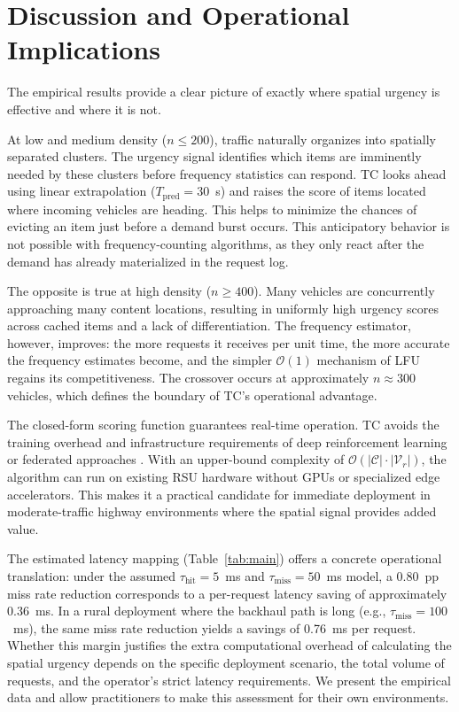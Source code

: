 \documentclass[preprint,12pt]{elsarticle}
\begin{document}
	\section{Discussion and Operational Implications}

	\label{sec:discussion}
	
	The empirical results provide a clear picture of exactly where spatial urgency is effective and where it is not. 
	
	At low and medium density ($n \leq 200$), traffic naturally organizes into spatially separated clusters. The urgency signal identifies which items are imminently needed by these clusters before frequency statistics can respond. TC looks ahead using linear extrapolation ($T_\text{pred} = 30$~s) and raises the score of items located where incoming vehicles are heading. This helps to minimize the chances of evicting an item just before a demand burst occurs. This anticipatory behavior is not possible with frequency-counting algorithms, as they only react after the demand has already materialized in the request log.
	
	The opposite is true at high density ($n \geq 400$). Many vehicles are concurrently approaching many content locations, resulting in uniformly high urgency scores across cached items and a lack of differentiation. The frequency estimator, however, improves: the more requests it receives per unit time, the more accurate the frequency estimates become, and the simpler $\mathcal{O}(1)$ mechanism of LFU regains its competitiveness. The crossover occurs at approximately $n \approx 300$ vehicles, which defines the boundary of TC's operational advantage.
	
	The closed-form scoring function guarantees real-time operation. TC avoids the training overhead and infrastructure requirements of deep reinforcement learning or federated approaches \cite{he2018mobility}. With an upper-bound complexity of $\mathcal{O}(|\mathcal{C}| \cdot |\mathcal{V}_r|)$, the algorithm can run on existing RSU hardware without GPUs or specialized edge accelerators. This makes it a practical candidate for immediate deployment in moderate-traffic highway environments where the spatial signal provides added value.
	
	The estimated latency mapping (Table~\ref{tab:main}) offers a concrete operational translation: under the assumed $\tau_\text{hit} = 5$~ms and $\tau_\text{miss} = 50$~ms model, a 0.80~pp miss rate reduction corresponds to a per-request latency saving of approximately 0.36~ms. In a rural deployment where the backhaul path is long (e.g., $\tau_\text{miss} = 100$~ms), the same miss rate reduction yields a savings of 0.76~ms per request. Whether this margin justifies the extra computational overhead of calculating the spatial urgency depends on the specific deployment scenario, the total volume of requests, and the operator's strict latency requirements. We present the empirical data and allow practitioners to make this assessment for their own environments.
\end{document}
